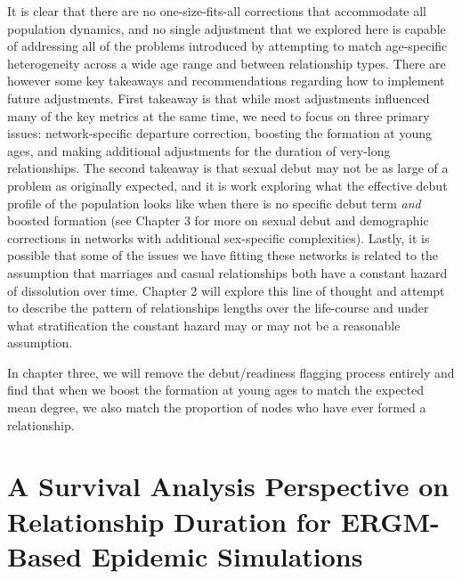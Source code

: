 \documentclass [11pt, proquest] {uwthesis}[2015/03/03]
\begin{document}
It is clear that there are no one-size-fits-all corrections that accommodate all population dynamics, and no single adjustment that we explored here is capable of addressing all of the problems introduced by attempting to match age-specific heterogeneity across a wide age range and between relationship types. There are however some key takeaways and recommendations regarding how to implement future adjustments. First takeaway is that while most adjustments influenced many of the key metrics at the same time, we need to focus on three primary issues: network-specific departure correction, boosting the formation at young ages, and making additional adjustments for the duration of very-long relationships. The second takeaway is that sexual debut may not be as large of a problem as originally expected, and it is work exploring what the effective debut profile of the population looks like when there is no specific debut term \emph{and} boosted formation (see Chapter 3 for more on sexual debut and demographic corrections in networks with additional sex-specific complexities). Lastly, it is possible that some of the issues we have fitting these networks is related to the assumption that marriages and casual relationships both have a constant hazard of dissolution over time. Chapter 2 will explore this line of thought and attempt to describe the pattern of relationships lengths over the life-course and under what stratification the constant hazard may or may not be a reasonable assumption.

In chapter three, we will remove the debut/readiness flagging process entirely and find that when we boost the formation at young ages to match the expected mean degree, we also match the proportion of nodes who have ever formed a relationship.

\hypertarget{surv}{%
\chapter{A Survival Analysis Perspective on Relationship Duration for ERGM-Based Epidemic Simulations}\label{surv}}
\end{document}
